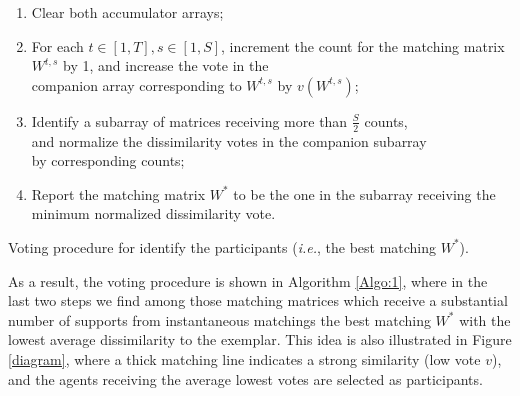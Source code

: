 \begin{algorithm}
\footnotesize{
\begin{enumerate}
\item Clear both accumulator arrays;
\item For each $t\in[1,T], s\in[1,S]$, increment the count for the matching matrix $W^{t,s}$ by 1, and increase the vote in the\\ 
companion array corresponding to $W^{t,s}$ by $v(W^{t,s})$;
\item Identify a subarray of matrices receiving more than $\frac{S}{2}$ counts, \\
and normalize the dissimilarity votes in the companion subarray 
\\by corresponding counts;
\item Report the matching matrix $W^{*}$ to be the one in the subarray receiving the minimum normalized dissimilarity vote.
\end{enumerate}
}
\caption{\small Voting procedure for identify the participants (\textit{i.e.}, the best matching $W^{*}$).}
\label{Algo:1}
\end{algorithm}

 As a result, the voting procedure is shown in Algorithm \ref{Algo:1}, where in the last two steps we find among those matching matrices which receive a substantial number of supports from instantaneous matchings the best matching $W^{*}$ with the lowest average dissimilarity to the exemplar. This idea is also illustrated in Figure \ref{diagram}, where a thick matching line indicates a strong similarity (low vote $v$), and the agents receiving the average lowest votes are selected as participants.



